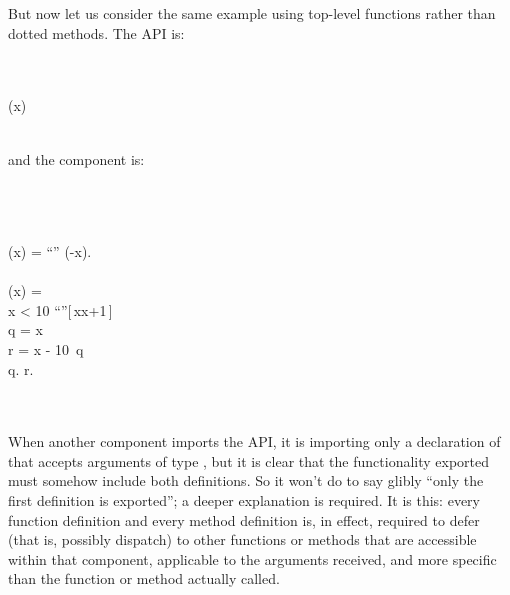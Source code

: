 But now let us consider the same example using top-level
functions rather than dotted methods.  The API is:
\begin{codeexamplesize}
\begin{FortressCode}
  \\
 \\
(x\COLON {})\COLON {} \\
 \\
 
\end{FortressCode}
\end{codeexamplesize}
and the component is:
\begin{codeexamplesize}
\begin{FortressCode}
  \\
  \\
 \\
(x\COLON {}) = \hbox{\rm{}``\STR{{-}}''} \mathrel{\Vert} (-x). \\
 \\
(x\COLON {}) = \\
\2\+ x < 10  \hbox{\rm{}``''}[\,x\COLONOP{}x+1\,]  \\
  \2\+q = x  \\
    r = x - 10\, q \\
    q. \mathrel{\Vert} r.\- \\
   \\
\- \\
 
\end{FortressCode}
\end{codeexamplesize}
When another component imports the API, it is importing
only a declaration of  that accepts arguments
of type , but it is clear that the functionality
exported must somehow include both definitions.
So it won't do to say glibly ``only the first definition
is exported''; a deeper explanation is required.
It is this: every function definition and every method definition is, in effect,
required to defer (that is, possibly dispatch) to other functions or methods
that are accessible within that component, applicable to the arguments received,
and more specific than the function or method actually called.

